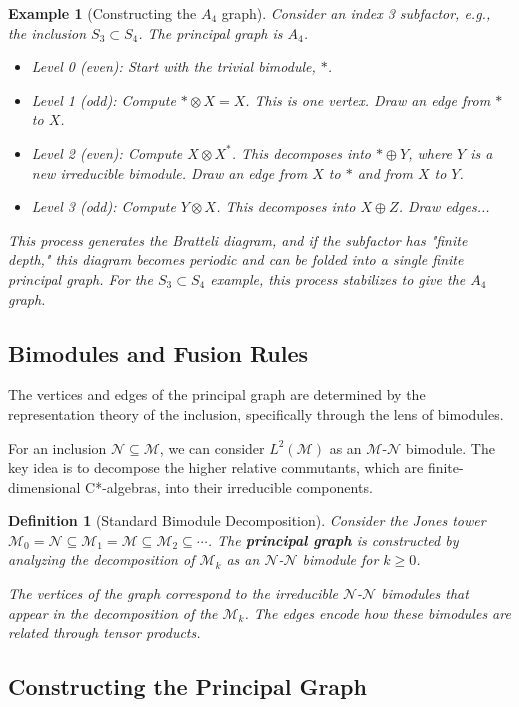 \documentclass[11pt, a4paper]{article}
\theoremstyle{colored_def}
\newtheorem{definition}{Definition}[section]
\theoremstyle{colored_thm}
\theoremstyle{colored_ex}
\newtheorem{example}{Example}[section]
\newcommand{\M}{\mathcal{M}}
\newcommand{\N}{\mathcal{N}}
\begin{document}
\begin{example}[Constructing the $A_4$ graph]
Consider an index 3 subfactor, e.g., the inclusion $S_3 \subset S_4$. The principal graph is $A_4$.
\begin{itemize}
    \item Level 0 (even): Start with the trivial bimodule, $*$.
    \item Level 1 (odd): Compute $* \otimes X = X$. This is one vertex. Draw an edge from $*$ to $X$.
    \item Level 2 (even): Compute $X \otimes X^*$. This decomposes into $* \oplus Y$, where $Y$ is a new irreducible bimodule. Draw an edge from $X$ to $*$ and from $X$ to $Y$.
    \item Level 3 (odd): Compute $Y \otimes X$. This decomposes into $X \oplus Z$. Draw edges...
\end{itemize}
This process generates the Bratteli diagram, and if the subfactor has "finite depth," this diagram becomes periodic and can be folded into a single finite principal graph. For the $S_3 \subset S_4$ example, this process stabilizes to give the $A_4$ graph.
\end{example}

\subsection{Bimodules and Fusion Rules}

The vertices and edges of the principal graph are determined by the representation theory of the inclusion, specifically through the lens of bimodules.

For an inclusion $\N \subseteq \M$, we can consider $L^2(\M)$ as an $\M$-$\N$ bimodule. The key idea is to decompose the higher relative commutants, which are finite-dimensional C*-algebras, into their irreducible components.

\begin{definition}[Standard Bimodule Decomposition]
Consider the Jones tower $\M_0 = \N \subseteq \M_1 = \M \subseteq \M_2 \subseteq \cdots$. The \textbf{principal graph} is constructed by analyzing the decomposition of $\M_k$ as an $\N$-$\N$ bimodule for $k \geq 0$.

The vertices of the graph correspond to the irreducible $\N$-$\N$ bimodules that appear in the decomposition of the $\M_k$. The edges encode how these bimodules are related through tensor products.
\end{definition}

\subsection{Constructing the Principal Graph}
\end{document}
